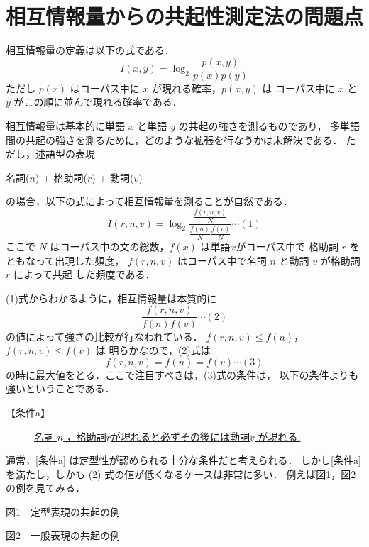 \section{相互情報量からの共起性測定法の問題点}

相互情報量の定義は以下の式である．
\[
I(x,y) = \log_{2} \frac{p(x,y)}{p(x)p(y)}
\]
ただし \( p(x) \) はコーパス中に \( x \) が現れる確率，\( p(x,y) \) は
コーパス中に \( x \) と \( y \) がこの順に並んで現れる確率である．

相互情報量は基本的に単語 \( x \) と単語 \( y \) の共起の強さを測るものであり，
多単語間の共起の強さを測るために，どのような拡張を行なうかは未解決である．
ただし，述語型の表現
\begin{center}
名詞(\(n\)) + 格助詞(\(r\)) + 動詞(\(v\))  
\end{center}
の場合，以下の式によって相互情報量を測ることが自然である．
\[
I(r,n,v) = \log_{2} \frac{\frac{f(r,n,v)}{N}}{\frac{f(n)}{N} \frac{f(v)}{N}} \cdots (1)
\]
ここで \( N \) はコーパス中の文の総数，\( f(x) \) は単語\( x \)がコーパス中で
格助詞 \( r \) をともなって出現した頻度，
\( f(r,n,v) \) はコーパス中で名詞 \( n \) と動詞 \( v \) が格助詞\( r \) によって共起
した頻度である．

(1)式からわかるように，相互情報量は本質的に
\[
\frac{f(r,n,v)}{f(n)f(v)} \cdots (2)
\]
の値によって強さの比較が行なわれている．
\( f(r,n,v) \leq f(n) \)，\( f(r,n,v) \leq f(v) \) は
明らかなので，(2)式は
\[
   f(r,n,v) = f(n) = f(v) \cdots (3)
\]
の時に最大値をとる．ここで注目すべきは，(3)式の条件は，
以下の条件よりも強いということである．

\begin{description}
\item[【条件a】] \underline{名詞 \( n \)  ，格助詞\( r \)が現れると必ずその後には動詞\( v \) が現れる.}
\end{description}

通常，[条件a] は定型性が認められる十分な条件だと考えられる．
しかし[条件a] を満たし，しかも (2) 式の値が低くなるケースは非常に多い．
例えば図1，図2の例を見てみる．


\begin{figure}[h]
\begin{center}
    
    
    
\end{center}
\end{figure}
\begin{minipage}{66mm} 
  \begin{center}
{\small {\gt 図1}\ \ 定型表現の共起の例}
  \end{center}
\end{minipage} \begin{minipage}{67mm}
  \begin{center}
{\small {\gt 図2}\ \ 一般表現の共起の例}
\normalsize
  \end{center}
\end{minipage}


